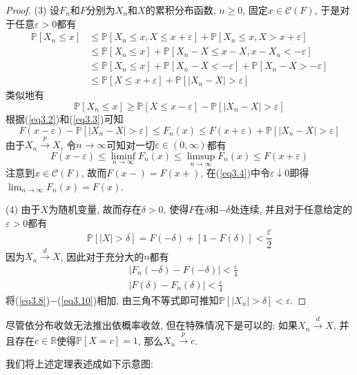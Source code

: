 \documentclass[cn, 12pt, math=mtpro2, bibstyle=apa, blue, twocol]{elegantbook}
\newcommand{\R}{\mathbb{R}}
\newcommand{\PP}{\mathbb{P}}
\newcommand{\limn}{\lim_{n\to\infty}}
\begin{document}
\begin{proof}
  (3) 设$F_n$和$F$分别为$X_n$和$X$的累积分布函数, $n\ge0$, 固定$x\in\mathscr{C}(F)$, 于是对于任意$\varepsilon>0$都有
  \begin{align}
  \PP[X_n\leq x]&\leq \PP[X_n\leq x, X\leq x+\varepsilon]+\PP[X_n\leq x, X>x+\varepsilon]\nonumber \\
  &\leq \PP[X_n\leq x]+\PP[X_n-X\leq x-X, x-X_n<-\varepsilon] \nonumber \\
  &\leq \PP[X_n\leq x]+\PP[X_n-X<-\varepsilon]+\PP[X_n-X>-\varepsilon] \nonumber \\
  &\leq \PP[X\leq x+\varepsilon]+\PP[|X_n-X|>\varepsilon] \label{eq3.2}
  \end{align}
  类似地有
  \begin{equation}\label{eq3.3}
    \PP[X_n\leq x]\geq \PP[X\leq x-\varepsilon]-\PP[|X_n-X|>\varepsilon]
  \end{equation}
  根据(\ref{eq3.2})和(\ref{eq3.3})可知
  $$F(x-\varepsilon)-\PP[|X_n-X|>\varepsilon]\leq F_n(x)\leq F(x+\varepsilon)+\PP[|X_n-X|>\varepsilon]$$
  由于$X_n\xrightarrow{p}X$, 令$n\to\infty$可知对一切$\varepsilon\in(0,\infty)$都有
  \begin{equation}\label{eq3.4}
    F(x-\varepsilon)\leq\liminf_{n\to\infty}F_n(x)\leq\limsup_{n\to\infty}F_n(x)\leq F(x+\varepsilon)
  \end{equation}
  注意到$x\in\mathscr{C}(F)$, 故而$F(x-)=F(x+)$, 在(\ref{eq3.4})中令$\varepsilon\downarrow 0$即得$\displaystyle\limn F_n(x)=F(x)$.

  (4) 由于$X$为随机变量, 故而存在$\delta>0$, 使得$F$在$\delta$和$-\delta$处连续, 并且对于任意给定的$\varepsilon>0$都有
  \begin{equation}\label{eq3.8}
    \PP[|X|>\delta]=F(-\delta)+[1-F(\delta)]<\frac{\varepsilon}{2}
  \end{equation}
  因为$X_n\xrightarrow{d}X$, 因此对于充分大的$n$都有
  \begin{align}
  &|F_n(-\delta)-F(-\delta)|<\frac{\varepsilon}{4} \label{eq3.9} \\
  &|F(\delta)-F_n(\delta)|<\frac{\varepsilon}{4} \label{eq3.10}
  \end{align}
  将(\ref{eq3.8})$-$(\ref{eq3.10})相加, 由三角不等式即可推知$\PP[|X_n|>\delta]<\varepsilon$.
\end{proof}
\begin{remark}
尽管依分布收敛无法推出依概率收敛, 但在特殊情况下是可以的: 如果$X_n\xrightarrow{d}X$, 并且存在$c\in\R$使得$\PP[X=c]=1$, 那么$X_n\xrightarrow{p}c$.
\end{remark}
我们将上述定理表述成如下示意图:
\end{document}
